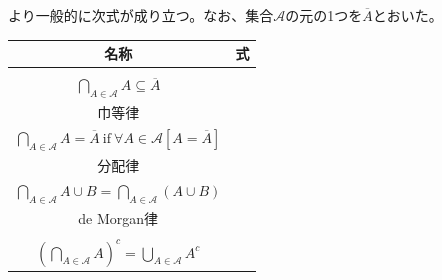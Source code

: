 \documentclass[a4paper]{jsarticle}
\begin{document}
\begin{thm}
\label{1.2.2.2}
より一般的に次式が成り立つ。なお、集合$\mathcal{A}$の元の1つを$\overline{A}$とおいた。
\begin{longtable}[c]{|c|c|}
\hline
名称 & 式 \\
\hline \hline
& \hspace{-0.5em}\begin{tabular}{c}
  $\overline{A} \subseteq \bigcup_{A \in \mathcal{A}} A $\\
  $\bigcap_{A \in \mathcal{A}} A \subseteq \overline{A}$ \end{tabular} \\
\hline
巾等律 & \hspace{-0.5em}\begin{tabular}{c}
  $\bigcup_{A \in \mathcal{A}} A = \overline{A}\ \mathrm{if}\ \forall A \in \mathcal{A}\left[ A = \overline{A} \right] $\\
  $\bigcap_{A \in \mathcal{A}} A = \overline{A}\ \mathrm{if}\ \forall A \in \mathcal{A}\left[ A = \overline{A} \right]$ 
\end{tabular}\\
\hline
分配律 & \hspace{-0.5em}\begin{tabular}{c}
  $\bigcup_{A \in \mathcal{A}} A \cap B = \bigcup_{A \in \mathcal{A}} (A \cap B) $\\
  $\bigcap_{A \in \mathcal{A}} A \cup B = \bigcap_{A \in \mathcal{A}} (A \cup B)$ 
\end{tabular}\\
\hline
\multirow{2}{*}{de Morgan律} & \hspace{-0.5em}\begin{tabular}{c}
  $B \setminus \bigcup_{A \in \mathcal{A}} A = \bigcap_{A \in \mathcal{A}} (B \setminus A) $\\
  $B \setminus \bigcap_{A \in \mathcal{A}} A = \bigcup_{A \in \mathcal{A}} (B \setminus A)$ 
\end{tabular}\\ \cline{2-2}
& \hspace{-0.5em}\begin{tabular}{c}
  $\left( \bigcup_{A \in \mathcal{A}} A \right)^{c} = \bigcap_{A \in \mathcal{A}} A^{c}$ \\
  $\left( \bigcap_{A \in \mathcal{A}} A \right)^{c} = \bigcup_{A \in \mathcal{A}} A^{c}$ 
\end{tabular}\\
\hline
\end{longtable}
\end{thm}
\end{document}
